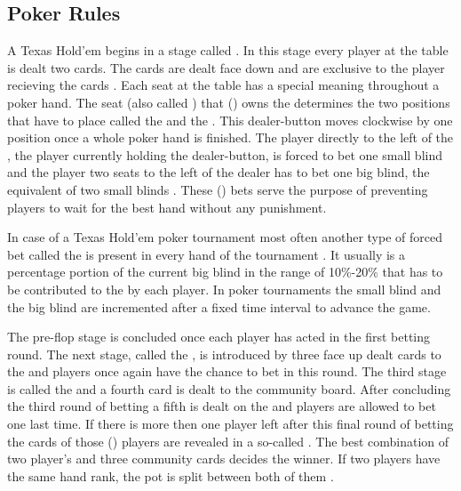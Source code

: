 \subsection{Poker Rules}
A Texas Hold'em  begins in a stage called . In this stage every player at the table is dealt two cards. The cards are dealt face down and are exclusive to the player recieving the cards \cite{billings_phd}. Each seat at the table has a special meaning throughout a poker hand. The seat (also called ) that () owns the  determines the two positions that have to place   called the  and the . This dealer-button moves clockwise by one position once a whole poker hand is finished. The player directly to the left of the , the player currently holding the dealer-button, is forced to bet one small blind and the player two seats to the left of the dealer has to bet one big blind, the equivalent of two small blinds \cite{master_nuno}. These () bets serve the purpose of preventing players to wait for the best hand without any punishment. \par In case of a Texas Hold'em poker tournament most often another type of forced bet called the  is present in every hand of the tournament \cite{poker_dummies}. It usually is a percentage portion of the current big blind in the range of 10\%-20\% that has to be contributed to the  by each player.
In poker tournaments the small blind and the big blind are incremented after a fixed time interval to advance the game.  \par
The pre-flop stage is concluded once each player has acted in the first betting round. The next stage, called the , is introduced by three face up dealt cards to the  and players once again have the chance to bet in this round. The third stage is called the  and a fourth card is dealt to the community board. After concluding the third round of betting a fifth  is dealt on the  and players are allowed to bet one last time. If there is more then one player left after this final round of betting the cards of those () players are revealed in a so-called . The best combination of two player's  and three community cards decides the winner. If two players have the same hand rank, the pot is split between both of them \cite{billings_phd}.
